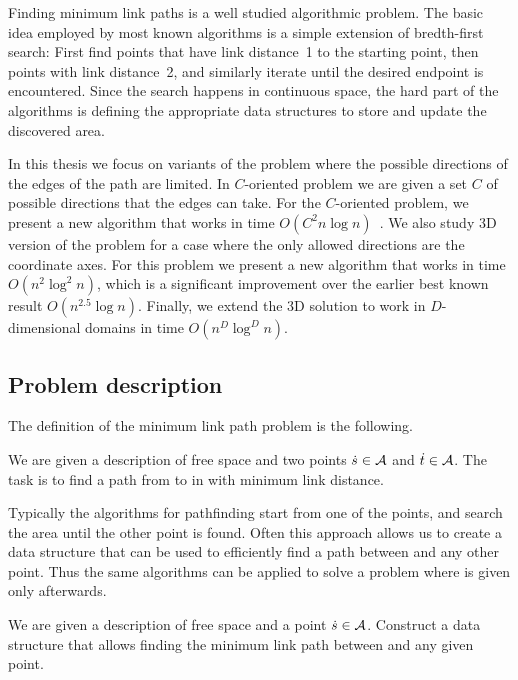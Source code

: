 \documentclass[english,gradu]{tktltiki2018}
\begin{document}
Finding minimum link paths is a well studied algorithmic problem.
The basic idea employed by most known algorithms is a simple extension of bredth-first search:
First find points that have link distance~1 to the starting point, then points with link distance~2, and similarly iterate until the desired endpoint is encountered.
Since the search happens in continuous space, the hard part of the algorithms is defining the appropriate data structures to store and update the discovered area.

In this thesis we focus on variants of the problem where the possible directions of the edges of the path are limited.
In $C$-oriented problem we are given a set $C$ of possible directions that the edges can take.
For the $C$-oriented problem, we present a new algorithm that works in time $O(C^2n\log n)$~\cite{revisited}.
We also study 3D version of the problem for a case where the only allowed directions are the coordinate axes.
For this problem we present a new algorithm that works in time $O(n^2\log^2n)$, which is a significant improvement over the earlier best known result $O(n^{2.5}\log n)$.\cite{restricted}
Finally, we extend the 3D solution to work in $D$-dimensional domains in time $O(n^D\log^Dn)$.

\subsection{Problem description}

The definition of the minimum link path problem is the following.
\begin{prob}\label{prob:path}
We are given a description of free space \fspace and two points $\dot{s}\in\mathcal{A}$ and $\dot{t}\in\mathcal{A}$.
The task is to find a path from \spt to \ept in \fspace with minimum link distance.
\end{prob}

Typically the algorithms for pathfinding start from one of the points, and search the area until the other point is found.
Often this approach allows us to create a data structure that can be used to efficiently find a path between \spt and any other point.
Thus the same algorithms can be applied to solve a problem where \ept is given only afterwards.

\begin{prob}\label{prob:map}
We are given a description of free space \fspace and a point $\dot{s}\in\mathcal{A}$.
Construct a data structure that allows finding the minimum link path between \spt and any given point.
\end{prob}
\end{document}
